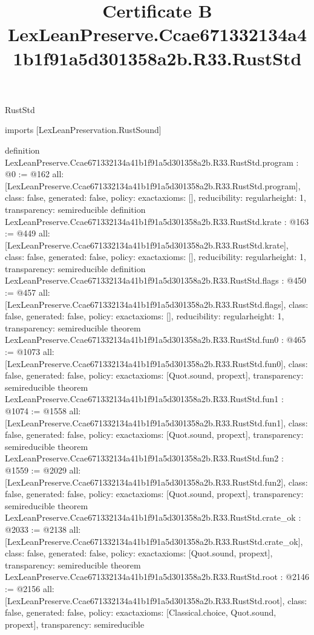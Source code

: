 \begin{lexlean}{RustStd}
\title{Certificate B LexLeanPreserve.Ccae671332134a41b1f91a5d301358a2b.R33.RustStd}
\begin{coremodule}
imports [LexLeanPreservation.RustSound]

definition LexLeanPreserve.Ccae671332134a41b1f91a5d301358a2b.R33.RustStd.program : @0 := @162 {
  all: [LexLeanPreserve.Ccae671332134a41b1f91a5d301358a2b.R33.RustStd.program],
  class: false,
  generated: false,
  policy: exact{axioms: []},
  reducibility: regular{height: 1},
  transparency: semireducible
}
definition LexLeanPreserve.Ccae671332134a41b1f91a5d301358a2b.R33.RustStd.krate : @163 := @449 {
  all: [LexLeanPreserve.Ccae671332134a41b1f91a5d301358a2b.R33.RustStd.krate],
  class: false,
  generated: false,
  policy: exact{axioms: []},
  reducibility: regular{height: 1},
  transparency: semireducible
}
definition LexLeanPreserve.Ccae671332134a41b1f91a5d301358a2b.R33.RustStd.flags : @450 := @457 {
  all: [LexLeanPreserve.Ccae671332134a41b1f91a5d301358a2b.R33.RustStd.flags],
  class: false,
  generated: false,
  policy: exact{axioms: []},
  reducibility: regular{height: 1},
  transparency: semireducible
}
theorem LexLeanPreserve.Ccae671332134a41b1f91a5d301358a2b.R33.RustStd.fun0 : @465 := @1073 {
  all: [LexLeanPreserve.Ccae671332134a41b1f91a5d301358a2b.R33.RustStd.fun0],
  class: false,
  generated: false,
  policy: exact{axioms: [Quot.sound, propext]},
  transparency: semireducible
}
theorem LexLeanPreserve.Ccae671332134a41b1f91a5d301358a2b.R33.RustStd.fun1 : @1074 := @1558 {
  all: [LexLeanPreserve.Ccae671332134a41b1f91a5d301358a2b.R33.RustStd.fun1],
  class: false,
  generated: false,
  policy: exact{axioms: [Quot.sound, propext]},
  transparency: semireducible
}
theorem LexLeanPreserve.Ccae671332134a41b1f91a5d301358a2b.R33.RustStd.fun2 : @1559 := @2029 {
  all: [LexLeanPreserve.Ccae671332134a41b1f91a5d301358a2b.R33.RustStd.fun2],
  class: false,
  generated: false,
  policy: exact{axioms: [Quot.sound, propext]},
  transparency: semireducible
}
theorem LexLeanPreserve.Ccae671332134a41b1f91a5d301358a2b.R33.RustStd.crate_ok : @2033 := @2138 {
  all: [LexLeanPreserve.Ccae671332134a41b1f91a5d301358a2b.R33.RustStd.crate_ok],
  class: false,
  generated: false,
  policy: exact{axioms: [Quot.sound, propext]},
  transparency: semireducible
}
theorem LexLeanPreserve.Ccae671332134a41b1f91a5d301358a2b.R33.RustStd.root : @2146 := @2156 {
  all: [LexLeanPreserve.Ccae671332134a41b1f91a5d301358a2b.R33.RustStd.root],
  class: false,
  generated: false,
  policy: exact{axioms: [Classical.choice, Quot.sound, propext]},
  transparency: semireducible
}


\end{coremodule}
\end{lexlean}
